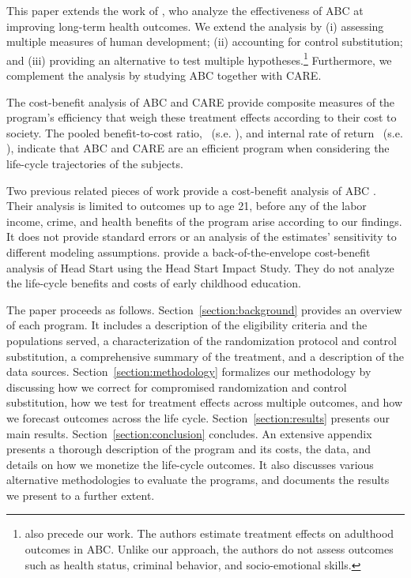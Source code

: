 This paper extends the work of \citet{Campbell_Conti_etal_2014_EarlyChildhoodInvestments}, who analyze the effectiveness of ABC at improving long-term health outcomes. We extend the analysis by (i) assessing multiple measures of human development; (ii) accounting for control substitution; and (iii) providing an alternative to test multiple hypotheses.\footnote{\cite{Campbell_Pungello_etal_2012_DP} also precede our work. The authors estimate treatment effects on adulthood outcomes in ABC. Unlike our approach, the authors do not assess outcomes such as health status, criminal behavior, and socio-emotional skills.} Furthermore, we complement the analysis by studying ABC together with CARE.

The cost-benefit analysis of ABC and CARE provide composite measures of the program's efficiency that weigh these treatment effects according to their cost to society. The pooled benefit-to-cost ratio, \bcp\ (s.e. \bcsep), and internal rate of return \irrp\ (s.e. \irrsep), indicate that ABC and CARE are an efficient program when considering the life-cycle trajectories of the subjects.

Two previous related pieces of work provide a cost-benefit analysis of ABC \citep{Masse_Barnett_2002_BOOKBenefitCostAnalysis,Barnett_Masse_2007_EER}. Their analysis is limited to outcomes up to age 21, before any of the labor income, crime, and health benefits of the program arise according to our findings. It does not provide standard errors or an analysis of the estimates' sensitivity to different modeling assumptions. \citet{Kline_Walters_2015_NBER-Evaluating} provide a back-of-the-envelope cost-benefit analysis of Head Start using the Head Start Impact Study. They do not analyze the life-cycle benefits and costs of early childhood education.

The paper proceeds as follows. Section~\ref{section:background}  provides an overview of each program. It includes a description of the eligibility criteria and the populations served, a characterization of the randomization protocol and control substitution, a comprehensive summary of the treatment, and a description of the data sources. Section~\ref{section:methodology} formalizes our methodology by discussing how we correct for compromised randomization and control substitution, how we test for treatment effects across multiple outcomes, and how we forecast outcomes across the life cycle. Section~\ref{section:results} presents our main results. Section~\ref{section:conclusion} concludes. An extensive appendix presents a thorough description of the program and its costs, the data, and details on how we monetize the life-cycle outcomes. It also discusses various alternative methodologies to evaluate the programs, and documents the results we present to a further extent.

